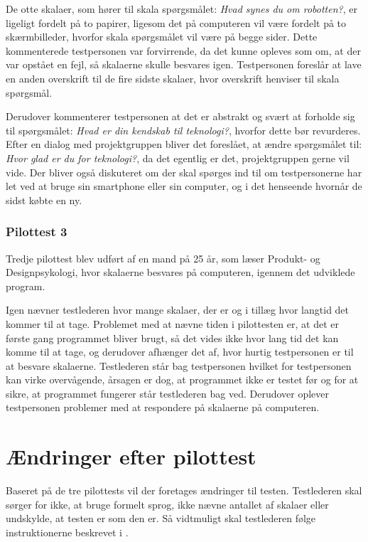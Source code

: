 De otte skalaer, som hører til skala spørgsmålet: \textit{Hvad synes du om robotten?}, er ligeligt fordelt på to papirer, ligesom det på computeren vil være fordelt på to skærmbilleder, hvorfor skala spørgsmålet vil være på begge sider. Dette kommenterede testpersonen var forvirrende, da det kunne opleves som om, at der var opstået en fejl, så skalaerne skulle besvares igen. Testpersonen foreslår at lave en anden overskrift til de fire sidste skalaer, hvor overskrift henviser til skala spørgsmål.

Derudover kommenterer testpersonen at det er abstrakt og svært at forholde sig til spørgsmålet: \textit{Hvad er din kendskab til teknologi?}, hvorfor dette bør revurderes. Efter en dialog med projektgruppen bliver det foreslået, at ændre spørgsmålet til: \textit{Hvor glad er du for teknologi?}, da det egentlig er det, projektgruppen gerne vil vide. Der bliver også diskuteret om der skal spørges ind til om testpersonerne har let ved at bruge sin smartphone eller sin computer, og i det henseende hvornår de sidst købte en ny. 

\subsubsection*{Pilottest 3}
\label{TestAfSkalaerPilot3}
%
Tredje pilottest blev udført af en mand på 25 år, som læser Produkt- og Designpsykologi, hvor skalaerne besvares på computeren, igennem det udviklede program. 

Igen nævner testlederen hvor mange skalaer, der er og i tillæg hvor langtid det kommer til at tage. Problemet med at nævne tiden i pilottesten er, at det er første gang programmet bliver brugt, så det vides ikke hvor lang tid det kan komme til at tage, og derudover afhænger det af, hvor hurtig testpersonen er til at besvare skalaerne. Testlederen står bag testpersonen hvilket for testpersonen kan virke overvågende, årsagen er dog, at programmet ikke er testet før og for at sikre, at programmet fungerer står testlederen bag ved. Derudover oplever testpersonen problemer med at respondere på skalaerne på computeren.   

\section{Ændringer efter pilottest}
\label{TestAfSkalaerAendringerPilot}
%
Baseret på de tre pilottests vil der foretages ændringer til testen. Testlederen skal sørger for ikke, at bruge formelt sprog, ikke nævne antallet af skalaer eller undskylde, at testen er som den er. Så vidtmuligt skal testlederen følge instruktionerne beskrevet i .

